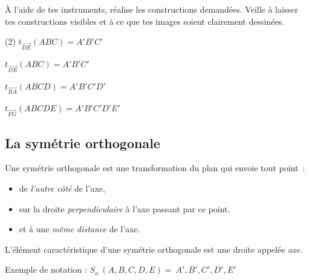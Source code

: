 \documentclass[../math2.tex]{subfiles}
\begin{document}
\begin{exercise}
    À l'aide de tes instruments, réalise les constructions demandées.
    Veille à laisser tes constructions visibles et à ce que tes images
    soient clairement dessinées.
    \begin{tasks}[after-item-skip=2cm](2)
        \task $t_{\overrightarrow{DE}}(ABC)=A'B'C'$
        \begin{center}
            \tikzspace
            
            \tikzspace
        \end{center}
        \task $t_{\overrightarrow{DE}}(ABC)=A'B'C'$
        \begin{center}
            \tikzspace
            
            \tikzspace
        \end{center}
        \task $t_{\overrightarrow{BA}}(ABCD)=A'B'C'D'$
        \begin{center}
            \tikzspace
            
            \tikzspace
        \end{center}
        \task $t_{\overrightarrow{FG}}(ABCDE)=A'B'C'D'E'$
        \begin{center}
            \tikzspace
            
            \tikzspace
        \end{center}
    \end{tasks}
\end{exercise}

\subsection{La symétrie orthogonale}
Une symétrie orthogonale est une transformation du plan qui envoie tout
point~:
\begin{itemize}[label=]
    \item de \emph{l'autre côté} de l'axe,
    \item sur la droite \emph{perpendiculaire} à l'axe passant par ce point,
    \item et à une \emph{même distance} de l'axe.
\end{itemize}
L'élément caractéristique d'une symétrie orthogonale est une droite
appelée \emph{axe.}

Exemple de notation : \(S_{a}\ (A,B,C,D,E) = \ A',B',C',D',E'\)

\end{document}
